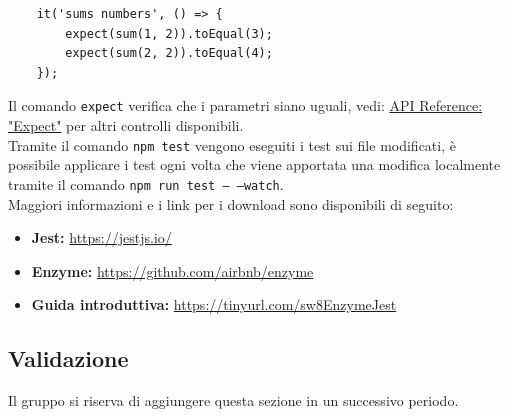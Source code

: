 \begin{verbatim}
	it('sums numbers', () => {
	  	expect(sum(1, 2)).toEqual(3);
  		expect(sum(2, 2)).toEqual(4);
	});
\end{verbatim}
Il comando \texttt{expect} verifica che i parametri siano uguali, vedi: \href{https://jestjs.io/docs/en/expect.html#content}{ API Reference: "Expect"} per altri controlli disponibili.\\
Tramite il comando \texttt{npm test} vengono eseguiti i test sui file modificati, è possibile applicare i test ogni volta che viene apportata una modifica localmente tramite il comando \texttt{npm run test -- --watch}.\\ 
Maggiori informazioni e i link per i download sono disponibili di seguito:
\begin{itemize}
	\item \textbf{Jest:} \url{https://jestjs.io/}
	\item \textbf{Enzyme:} \url{https://github.com/airbnb/enzyme}
	\item \textbf{Guida introduttiva:} \url{https://tinyurl.com/sw8EnzymeJest}
\end{itemize}


\subsection{Validazione}
Il gruppo \gruppo \space si riserva di aggiungere questa sezione in un successivo periodo.